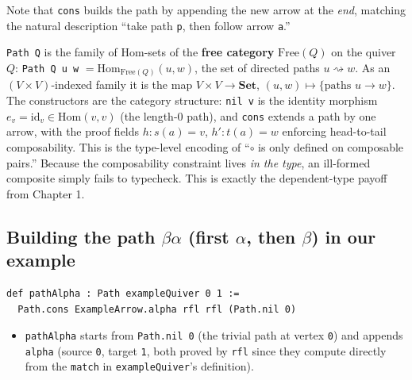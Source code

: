 Note that \texttt{cons} builds the path by appending the new arrow at the \emph{end}, matching the natural description ``take path \texttt{p}, then follow arrow \texttt{a}.''

\begin{mathreading}

\texttt{Path Q} is the family of Hom-sets of the \textbf{free category} \(\mathrm{Free}(Q)\) on the quiver \(Q\): \texttt{Path Q u w} \(=
\mathrm{Hom}_{\mathrm{Free}(Q)}(u, w)\), the set of directed paths \(u
\rightsquigarrow w\). As an \((V\times V)\)-indexed family it is the map \(V \times V \to \mathbf{Set}\), \((u,w) \mapsto \{\text{paths } u \to w\}\). The constructors are the category structure: \texttt{nil v} is the identity morphism \(e_v = \mathrm{id}_v \in \mathrm{Hom}(v,v)\) (the length-\(0\) path), and \texttt{cons} extends a path by one arrow, with the proof fields \(h : s(a) = v\), \(h' : t(a) = w\) enforcing head-to-tail composability. This is the type-level encoding of ``\(\circ\) is only defined on composable pairs.'' Because the composability constraint lives \emph{in the type}, an ill-formed composite simply fails to typecheck. This is exactly the dependent-type payoff from Chapter 1.

\end{mathreading}

\subsection{\texorpdfstring{Building the path \(\beta\alpha\) (first \(\alpha\), then \(\beta\)) in our example}{Building the path \textbackslash beta\textbackslash alpha (first \textbackslash alpha, then \textbackslash beta) in our example}}\label{sec:11-path-algebras:04-paths-as-inductive-type:2}

\begin{lstlisting}
def pathAlpha : Path exampleQuiver 0 1 :=
  Path.cons ExampleArrow.alpha rfl rfl (Path.nil 0)
\end{lstlisting}

\begin{itemize}
\tightlist
\item
  \texttt{pathAlpha} starts from \texttt{Path.nil 0} (the trivial path at vertex \texttt{0}) and appends \texttt{alpha} (source \texttt{0}, target \texttt{1}, both proved by \texttt{rfl} since they compute directly from the \texttt{match} in \texttt{exampleQuiver}'s definition).
\end{itemize}

